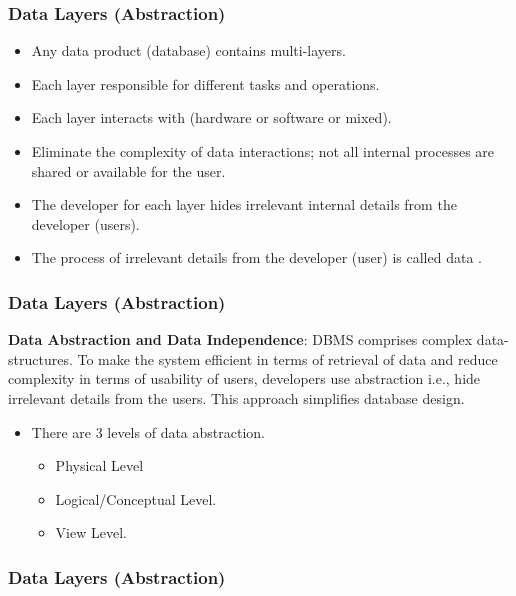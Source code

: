 \begin{frame}
    \frametitle{Data Layers (Abstraction)}
    \begin{itemize}[<+->]
        \item Any data product (database) contains multi-layers.
        \item Each layer responsible for different tasks and operations.
        \item Each layer interacts with (hardware or software or mixed).
        \item Eliminate the complexity of data interactions; not all internal processes are shared or available for the user.
        \item The developer for each layer hides irrelevant internal details from the developer (users).
        \item The process of \textbf{\underline{}} irrelevant details from the developer (user) is called data \textbf{\underline{}}.
    \end{itemize}
\end{frame}
\begin{frame}
    \frametitle{Data Layers (Abstraction)}
    \begin{definition}
        \textbf{Data Abstraction and Data Independence}: DBMS comprises complex data-structures. To make the system efficient in terms of retrieval of data and reduce complexity in terms of usability of users, developers use abstraction i.e., hide irrelevant details from the users. This approach simplifies database design.

    \end{definition}
    \begin{itemize}[<+->]
        \item There are 3 levels of data abstraction.
        \begin{itemize}[<+->]
            \item Physical Level
            \item Logical/Conceptual Level.
            \item View Level.
        \end{itemize}
    \end{itemize}
\end{frame}
\begin{frame}
    \frametitle{Data Layers (Abstraction)}
    
\end{frame}

